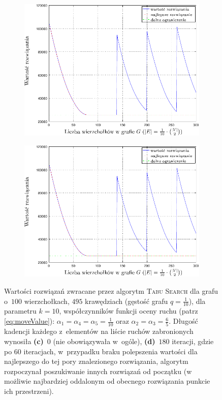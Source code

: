 \begin{figure}[!htbp]
	\renewcommand\figurename{Wykres}
	\ContinuedFloat
	\null\hfill
	\begin{subfigure}[b]{0.45\textwidth}
		\includegraphics[width=\textwidth]{Chapter_VI/RRIMST3-example/RRIMST3_psfrag}
		\caption{}
		\label{fig:rrimst1:c}
	\end{subfigure}
	\hfill
	\begin{subfigure}[b]{0.45\textwidth}
		\includegraphics[width=\textwidth]{Chapter_VI/RRIMST4-example/RRIMST4_psfrag}
		\caption{}
		\label{fig:rrimst1:d}
	\end{subfigure}
	\hfill\null
	\caption{
		Wartości rozwiązań zwracane przez algorytm \textsc{Tabu Search} dla grafu o~$100$ wierzchołkach, $495$ krawędziach (gęstość grafu $q = \frac{1}{10}$), dla parametru $k = 10$, współczynników funkcji oceny ruchu (patrz \ref{eq:moveValue}): $\alpha_{1} = \alpha_{4} = \alpha_{5} = \frac{1}{10}$ oraz $\alpha_{2} = \alpha_{3} = \frac{6}{5}$. Długość kadencji każdego z~elementów na liście ruchów zabronionych wynosiła \textbf{(c)}~$0$ (nie obowiązywała w~ogóle), \textbf{(d)}~$180$ iteracji, gdzie po $60$ iteracjach, w~przypadku braku polepszenia wartości dla najlepszego do tej pory znalezionego rozwiązania, algorytm rozpoczynał poszukiwanie innych rozwiązań od początku (w możliwie najbardziej oddalonym od obecnego rozwiązania punkcie ich przestrzeni).
}
\end{figure}
